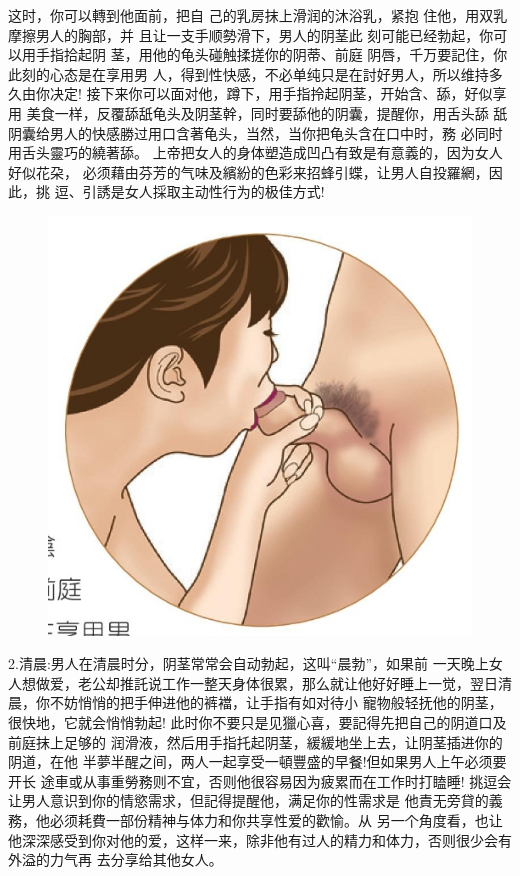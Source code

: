 \documentclass[12pt,UTF8]{ctexbook}
\begin{document}
这时，你可以轉到他面前，把自
己的乳房抹上滑润的沐浴乳，紧抱
住他，用双乳摩擦男人的胸部，并
且让一支手顺勢滑下，男人的阴茎此
刻可能已经勃起，你可以用手指拾起阴
茎，用他的龟头碰触揉搓你的阴蒂、前庭
阴唇，千万要記住，你此刻的心态是在享用男
人，得到性快感，不必单纯只是在討好男人，所以维持多久由你决定!
接下来你可以面对他，蹲下，用手指拎起阴茎，开始含、舔，好似享用
美食一样，反覆舔舐龟头及阴茎幹，同时要舔他的阴囊，提醒你，用舌头舔
舐阴囊给男人的快感勝过用口含著龟头，当然，当你把龟头含在口中时，務
必同时用舌头靈巧的繞著舔。
上帝把女人的身体塑造成凹凸有致是有意義的，因为女人好似花朶，
必须藉由芬芳的气味及繽紛的色彩来招蜂引蝶，让男人自投羅網，因此，挑
逗、引誘是女人採取主动性行为的极佳方式!

\begin{figure}[htbp]
	\centering
	\includegraphics[width=0.7\linewidth]{15}
	\caption{}
	\label{fig:1}
\end{figure}

2.清晨:男人在清晨时分，阴茎常常会自动勃起，这叫“晨勃”，如果前
一天晚上女人想做爱，老公却推託说工作一整天身体很累，那么就让他好好睡上一觉，翌日清晨，你不妨悄悄的把手伸进他的裤襠，让手指有如对待小
寵物般轻抚他的阴茎，很快地，它就会悄悄勃起!
此时你不要只是见獵心喜，要記得先把自己的阴道口及前庭抹上足够的
润滑液，然后用手指托起阴茎，緩緩地坐上去，让阴茎插进你的阴道，在他
半夢半醒之间，两人一起享受一頓豐盛的早餐!但如果男人上午必须要开长
途車或从事重勞務则不宜，否则他很容易因为疲累而在工作时打瞌睡!
挑逗会让男人意识到你的情慾需求，但記得提醒他，满足你的性需求是
他責无旁貸的義務，他必须耗費一部份精神与体力和你共享性爱的歡愉。从
另一个角度看，也让他深深感受到你对他的爱，这样一来，除非他有过人的精力和体力，否则很少会有外溢的力气再
去分享给其他女人。
\end{document}
